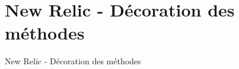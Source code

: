 \chapter{New Relic - Décoration des méthodes}
\label{app:newrelicdecorationmethodes}

\vspace{-10}

\begin{listing}[H]
  \caption{New Relic - Décoration des méthodes}
\end{listing}